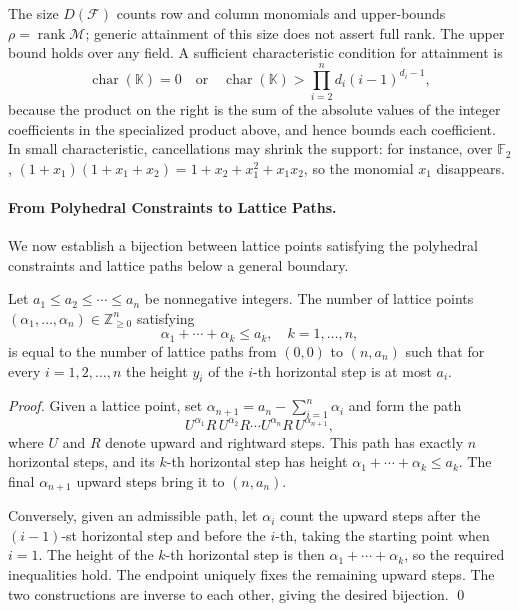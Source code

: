 \begin{remark}\label{rem:support_vs_rank}
The size $D(\mathcal F)$ counts row and column monomials and upper-bounds $\rho=\operatorname{rank}\mathcal M$; generic attainment of this size does not assert full rank. The upper bound holds over any field. A sufficient characteristic condition for attainment is
\[
\operatorname{char}(\mathbb K)=0
\quad\text{or}\quad
\operatorname{char}(\mathbb K)>\prod_{i=2}^n d_i(i-1)^{d_i-1},
\]
because the product on the right is the sum of the absolute values of the integer coefficients in the specialized product above, and hence bounds each coefficient. In small characteristic, cancellations may shrink the support: for instance, 
over $\mathbb F_2$,
$(1+x_1)(1+x_1+x_2)=1+x_2+x_1^2+x_1x_2$,
so the monomial $x_1$ disappears.
\end{remark}

\paragraph{From Polyhedral Constraints to Lattice Paths.}
We now establish a bijection between lattice points satisfying the polyhedral constraints and lattice paths below a general boundary.

\begin{lemma}\label{lem:lattice_path_count}
	Let $a_1 \le a_2 \le \cdots \le a_{n}$ be nonnegative integers.
	The number of lattice points 
	$(\alpha_1,\ldots,\alpha_{n})\in\mathbb Z_{\ge0}^{n}$ satisfying
	\[
	\alpha_1 + \cdots + \alpha_k \le a_k,
	\quad k=1,\ldots,n,
	\]
	is equal to the number of lattice paths 
	from $(0,0)$ to $(n,a_{n})$ such that 
	for every $i=1,2,\ldots,n$ the height $y_i$ of the $i$-th horizontal step is at most $a_i$.
\end{lemma}

\begin{proof}
Given a lattice point, set $\alpha_{n+1}=a_n-\sum_{i=1}^n\alpha_i$ and form the path
\[
U^{\alpha_1}R\,U^{\alpha_2}R\cdots U^{\alpha_n}R\,U^{\alpha_{n+1}},
\]
where $U$ and $R$ denote upward and rightward steps. This path has exactly $n$ horizontal steps, and its $k$-th horizontal step has height $\alpha_1+\cdots+\alpha_k\le a_k$. The final $\alpha_{n+1}$ upward steps bring it to $(n,a_n)$.

Conversely, given an admissible path, let $\alpha_i$ count the upward steps after the $(i-1)$-st horizontal step and before the $i$-th, taking the starting point when $i=1$. The height of the $k$-th horizontal step is then $\alpha_1+\cdots+\alpha_k$, so the required inequalities hold. The endpoint uniquely fixes the remaining upward steps. The two constructions are inverse to each other, giving the desired bijection.
\qed
\end{proof}

